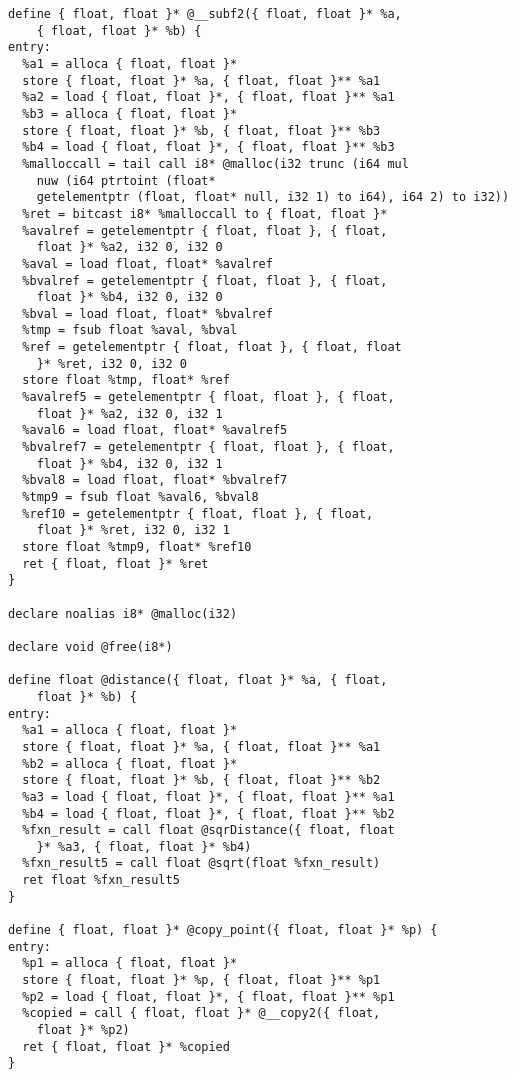 \documentclass[main.tex]{subfiles}
\begin{document}
{\begin{lstlisting}
define { float, float }* @__subf2({ float, float }* %a,
    { float, float }* %b) {
entry:
  %a1 = alloca { float, float }*
  store { float, float }* %a, { float, float }** %a1
  %a2 = load { float, float }*, { float, float }** %a1
  %b3 = alloca { float, float }*
  store { float, float }* %b, { float, float }** %b3
  %b4 = load { float, float }*, { float, float }** %b3
  %malloccall = tail call i8* @malloc(i32 trunc (i64 mul
    nuw (i64 ptrtoint (float* 
    getelementptr (float, float* null, i32 1) to i64), i64 2) to i32))
  %ret = bitcast i8* %malloccall to { float, float }*
  %avalref = getelementptr { float, float }, { float,
    float }* %a2, i32 0, i32 0
  %aval = load float, float* %avalref
  %bvalref = getelementptr { float, float }, { float,
    float }* %b4, i32 0, i32 0
  %bval = load float, float* %bvalref
  %tmp = fsub float %aval, %bval
  %ref = getelementptr { float, float }, { float, float
    }* %ret, i32 0, i32 0
  store float %tmp, float* %ref
  %avalref5 = getelementptr { float, float }, { float,
    float }* %a2, i32 0, i32 1
  %aval6 = load float, float* %avalref5
  %bvalref7 = getelementptr { float, float }, { float,
    float }* %b4, i32 0, i32 1
  %bval8 = load float, float* %bvalref7
  %tmp9 = fsub float %aval6, %bval8
  %ref10 = getelementptr { float, float }, { float, 
    float }* %ret, i32 0, i32 1
  store float %tmp9, float* %ref10
  ret { float, float }* %ret
}

declare noalias i8* @malloc(i32)

declare void @free(i8*)

define float @distance({ float, float }* %a, { float,
    float }* %b) {
entry:
  %a1 = alloca { float, float }*
  store { float, float }* %a, { float, float }** %a1
  %b2 = alloca { float, float }*
  store { float, float }* %b, { float, float }** %b2
  %a3 = load { float, float }*, { float, float }** %a1
  %b4 = load { float, float }*, { float, float }** %b2
  %fxn_result = call float @sqrDistance({ float, float
    }* %a3, { float, float }* %b4)
  %fxn_result5 = call float @sqrt(float %fxn_result)
  ret float %fxn_result5
}

define { float, float }* @copy_point({ float, float }* %p) {
entry:
  %p1 = alloca { float, float }*
  store { float, float }* %p, { float, float }** %p1
  %p2 = load { float, float }*, { float, float }** %p1
  %copied = call { float, float }* @__copy2({ float,
    float }* %p2)
  ret { float, float }* %copied
}


\end{lstlisting}}
\end{document}
